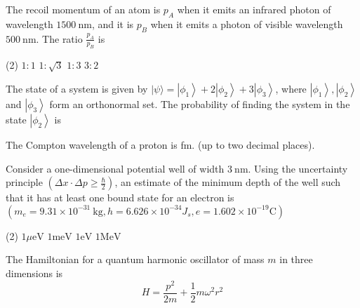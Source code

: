\begin{enumerate}
\begin{minipage}{\textwidth}
\end{minipage}
	\begin{minipage}{\textwidth}
	\item The recoil momentum of an atom is $p_{A}$ when it emits an infrared photon of wavelength $1500 \mathrm{~nm}$, and it is $p_{B}$ when it emits a photon of visible wavelength $500 \mathrm{~nm}$. The ratio $\frac{p_{A}}{p_{B}}$ is
\end{minipage}
\begin{tasks}(2)
	\task[\textbf{A.}] $1: 1$
	\task[\textbf{B.}]$1: \sqrt{3}$
	\task[\textbf{C.}]$1: 3$
	\task[\textbf{D.}] $3: 2$
\end{tasks}
\begin{minipage}{\textwidth}
	\item The state of a system is given by $|\psi\rangle=\left|\phi_{1}\right\rangle+2\left|\phi_{2}\right\rangle+3\left|\phi_{3}\right\rangle$, where $\left|\phi_{1}\right\rangle,\left|\phi_{2}\right\rangle$ and $\left|\phi_{3}\right\rangle$ form an orthonormal set. The probability of finding the system in the state $\left|\phi_{2}\right\rangle$ is
\end{minipage}
	\begin{minipage}{\textwidth}
	\item The Compton wavelength of a proton is fm. (up to two decimal places).
\end{minipage}
	\begin{minipage}{\textwidth}
	\item Consider a one-dimensional potential well of width $3 \mathrm{~nm}$. Using the uncertainty principle $\left(\Delta x \cdot \Delta p \geq \frac{\hbar}{2}\right)$, an estimate of the minimum depth of the well such that it has at least one bound state for an electron is $\left(m_{e}=9.31 \times 10^{-31} \mathrm{~kg}, h=6.626 \times 10^{-34} J_{s}, e=1.602 \times 10^{-19} \mathrm{C}\right)$
\end{minipage}
\begin{tasks}(2)
	\task[\textbf{A.}] $1 \mu \mathrm{eV}$
	\task[\textbf{B.}]$1 \mathrm{meV}$
	\task[\textbf{C.}]$1 \mathrm{eV}$
	\task[\textbf{D.}]$1 \mathrm{MeV}$
\end{tasks}
	\begin{minipage}{\textwidth}
	\item The Hamiltonian for a quantum harmonic oscillator of mass $m$ in three dimensions is
	$$
	H=\frac{p^{2}}{2 m}+\frac{1}{2} m \omega^{2} r^{2}
$$
\end{minipage}
\end{enumerate}
